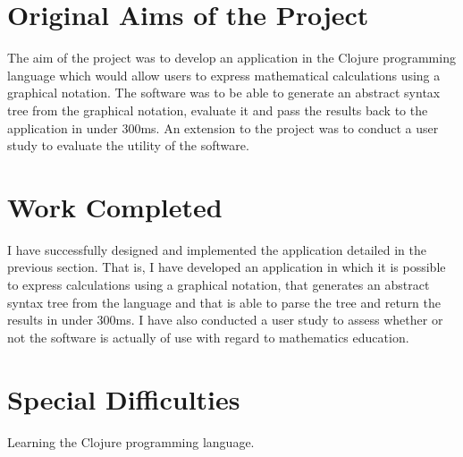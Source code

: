 \documentclass[12pt,twoside,notitlepage]{report}
\begin{document}
\section*{Original Aims of the Project}

The aim of the project was to develop an application in the Clojure programming
language which would allow users to express mathematical calculations using a
graphical notation.  The software was to be able to generate an abstract syntax
tree from the graphical notation, evaluate it and pass the results back to the
application in under 300ms.  An extension to the project was to conduct a user
study to evaluate the utility of the software.
%


\section*{Work Completed}

I have successfully designed and implemented the application detailed in the
previous section.  That is, I have developed an application in which it is
possible to express calculations using a graphical notation, that generates an
abstract syntax tree from the language and that is able to parse the tree and
return the results in under 300ms.  I have also conducted a user study to assess
whether or not the software is actually of use with regard to mathematics
education.
%

\section*{Special Difficulties}

Learning the Clojure programming language.
%
\end{document}

